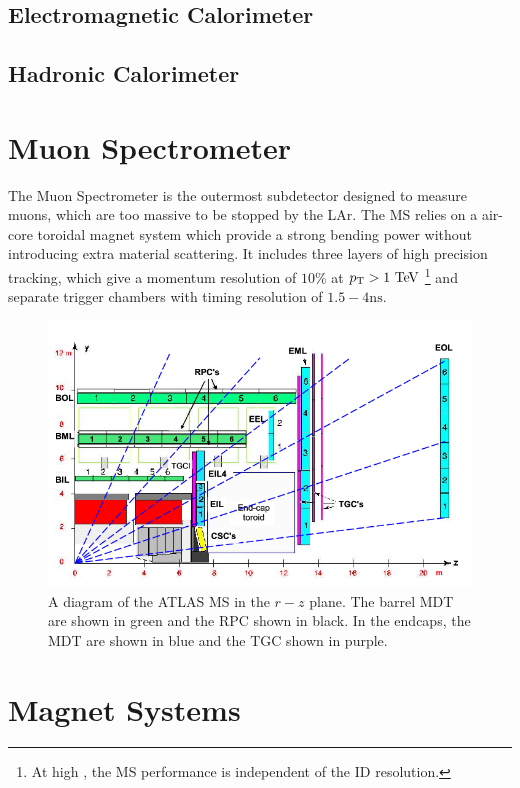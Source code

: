 \subsection{Electromagnetic Calorimeter}

\subsection{Hadronic Calorimeter}


\section{Muon Spectrometer}
The Muon Spectrometer is the outermost subdetector designed to measure muons, which are too massive to be stopped by the \ac{LAr}. The \ac{MS} relies on a air-core toroidal magnet system which provide a strong bending power without introducing extra material scattering. It includes three layers of high precision tracking, which give a momentum resolution of $10\%$ at $\pT > 1 \TeV$ \footnote{At high \pt, the \ac{MS} performance is independent of the \ac{ID} resolution.} and separate trigger chambers with timing resolution of $1.5-4 \textrm{ns}$. 

\begin{figure}[htbp]
\centering
\includegraphics[width=.8\textwidth]{figures/Detector/atlas-ms.png}
\caption{A diagram of the \ac{ATLAS} \ac{MS} in the $r-z$ plane. The barrel \ac{MDT} are shown in green and the \ac{RPC} shown in black. In the endcaps, the \ac{MDT} are shown in blue and the \ac{TGC} shown in purple. }
\label{fig:atlas-ms}
\end{figure}


\section{Magnet Systems}
\label{sec:magnets}






